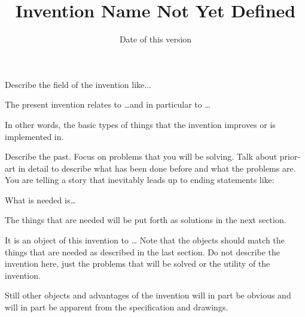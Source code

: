 \documentclass[english]{uspatent}
\begin{document}




\title{Invention Name Not Yet Defined}
\date{Date of this version}

\maketitle


\patentParagraph Describe the field of the invention like...

\patentParagraph The present invention relates to \ldots and in particular to \ldots

\patentParagraph In other words, the basic types of things that the invention improves or is implemented in.


\patentParagraph Describe the past. Focus on problems that you will be solving. Talk about prior-art in detail to describe what has been done before and what the problems are. You are telling a story that inevitably leads up to ending statements like:

\patentParagraph What is needed is\ldots

\patentParagraph The things that are needed will be put forth as solutions in the next section.


\patentParagraph It is an object of this invention to \ldots{} Note that the objects should match the things that are needed as described in the last section. Do not describe the invention here, just the problems that will be solved or the utility of the invention.

\patentParagraph Still other objects and advantages of the invention will in part be obvious and will in part be apparent from the specification and drawings.

\end{document}
